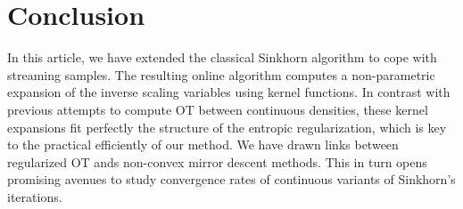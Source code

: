 
\section{Conclusion}

In this article, we have extended the classical Sinkhorn algorithm to cope with streaming samples. The resulting online algorithm computes a non-parametric expansion of the inverse scaling variables using kernel functions. In contrast with previous attempts to compute OT between continuous densities, these kernel expansions fit perfectly the structure of the entropic regularization, which is key to the practical efficiently of our method. 
%
We have drawn links between regularized OT ands non-convex mirror descent methods. This in turn opens promising avenues to study convergence rates of continuous variants of Sinkhorn's iterations.